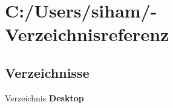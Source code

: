 \section{C:/Users/siham/-Verzeichnisreferenz}
\label{dir_C_3A_2FUsers_2Fsiham_2F}


\subsection*{Verzeichnisse}
\begin{CompactItemize}
\item 
Verzeichnis {\bf Desktop}
\end{CompactItemize}
